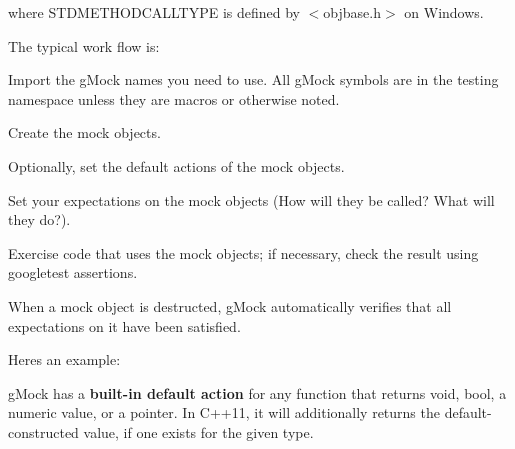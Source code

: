 where {\ttfamily S\+T\+D\+M\+E\+T\+H\+O\+D\+C\+A\+L\+L\+T\+Y\+PE} is defined by {\ttfamily $<$objbase.\+h$>$} on Windows.

The typical work flow is\+:


\begin{DoxyEnumerate}
\item Import the g\+Mock names you need to use. All g\+Mock symbols are in the {\ttfamily testing} namespace unless they are macros or otherwise noted.
\item Create the mock objects.
\item Optionally, set the default actions of the mock objects.
\item Set your expectations on the mock objects (How will they be called? What will they do?).
\item Exercise code that uses the mock objects; if necessary, check the result using googletest assertions.
\item When a mock object is destructed, g\+Mock automatically verifies that all expectations on it have been satisfied.
\end{DoxyEnumerate}

Here\textquotesingle{}s an example\+:




g\+Mock has a {\bfseries built-\/in default action} for any function that returns {\ttfamily void}, {\ttfamily bool}, a numeric value, or a pointer. In C++11, it will additionally returns the default-\/constructed value, if one exists for the given type.

